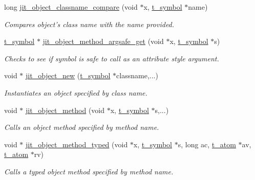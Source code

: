 \begin{DoxyCompactItemize}
\item 
long \hyperlink{group__objectmod_ga4fdf2959d720fe67e1ecc777189caa63}{jit\_\-object\_\-classname\_\-compare} (void $\ast$x, \hyperlink{structt__symbol}{t\_\-symbol} $\ast$name)
\begin{DoxyCompactList}\small\item\em Compares object's class name with the name provided. \item\end{DoxyCompactList}\item 
\hyperlink{structt__symbol}{t\_\-symbol} $\ast$ \hyperlink{group__objectmod_gacbb8c55e2c6c564d6018b8550cf7f98f}{jit\_\-object\_\-method\_\-argsafe\_\-get} (void $\ast$x, \hyperlink{structt__symbol}{t\_\-symbol} $\ast$s)
\begin{DoxyCompactList}\small\item\em Checks to see if symbol is safe to call as an attribute style argument. \item\end{DoxyCompactList}\item 
void $\ast$ \hyperlink{group__objectmod_gabde2eb49750992ec4125af862b402342}{jit\_\-object\_\-new} (\hyperlink{structt__symbol}{t\_\-symbol} $\ast$classname,...)
\begin{DoxyCompactList}\small\item\em Instantiates an object specified by class name. \item\end{DoxyCompactList}\item 
void $\ast$ \hyperlink{group__objectmod_ga9e1b9b8ed4fce611de26a74c6e1452c8}{jit\_\-object\_\-method} (void $\ast$x, \hyperlink{structt__symbol}{t\_\-symbol} $\ast$s,...)
\begin{DoxyCompactList}\small\item\em Calls an object method specified by method name. \item\end{DoxyCompactList}\item 
void $\ast$ \hyperlink{group__objectmod_ga9c9b8591a887cddd19b313c8e995fbea}{jit\_\-object\_\-method\_\-typed} (void $\ast$x, \hyperlink{structt__symbol}{t\_\-symbol} $\ast$s, long ac, \hyperlink{structt__atom}{t\_\-atom} $\ast$av, \hyperlink{structt__atom}{t\_\-atom} $\ast$rv)
\begin{DoxyCompactList}\small\item\em Calls a typed object method specified by method name. \item\end{DoxyCompactList}\item 

\end{DoxyCompactItemize}
